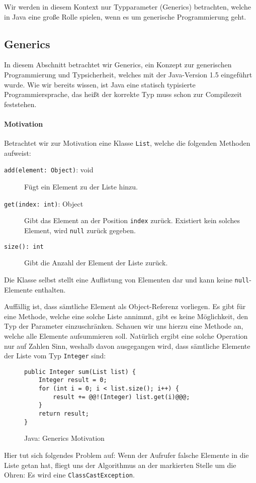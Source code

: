 
Wir werden in diesem Kontext nur Typparameter (Generics) betrachten, welche in Java eine große Rolle spielen, wenn es um generische Programmierung geht.

\subsection{Generics}
	\label{sec:generics}

	In diesem Abschnitt betrachtet wir Generics, ein Konzept zur generischen Programmierung und Typsicherheit, welches mit der Java-Version 1.5 eingeführt wurde. Wie wir bereits wissen, ist Java eine statisch typisierte Programmiersprache, das heißt der korrekte Typ muss schon zur Compilezeit feststehen.
	
	\paragraph{Motivation}
		Betrachtet wir zur Motivation eine Klasse \texttt{List}, welche die folgenden Methoden aufweist:
		\begin{description}
			\item[\texttt{add(element: Object)}: void] Fügt ein Element zu der Liste hinzu.
			\item[\texttt{get(index: int)}: Object] Gibt das Element an der Position \texttt{index} zurück. Existiert kein solches Element, wird \texttt{null} zurück gegeben.
			\item[\texttt{size(): int}] Gibt die Anzahl der Element der Liste zurück.
		\end{description}
		Die Klasse selbst stellt eine Auflistung von Elementen dar und kann keine \texttt{null}-Elemente enthalten.
		
		Auffällig ist, dass sämtliche Element als Object-Referenz vorliegen. Es gibt für eine Methode, welche eine solche Liste annimmt, gibt es keine Möglichkeit, den Typ der Parameter einzuschränken. Schauen wir uns hierzu eine Methode an, welche alle Elemente aufsummieren soll. Natürlich ergibt eine solche Operation nur auf Zahlen Sinn, weshalb davon ausgegangen wird, dass sämtliche Elemente der Liste vom Typ \texttt{Integer} sind:
		\begin{figure}[H]
			\centering
			\begin{lstlisting}[style = base]
public Integer sum(List list) {
	Integer result = 0;
	for (int i = 0; i < list.size(); i++) {
		result += @@!(Integer) list.get(i)@@@;
	}
	return result;
}
			\end{lstlisting}
			\caption{Java: Generics Motivation}
			\label{fig:generics_motivation}
		\end{figure}
		Hier tut sich folgendes Problem auf: Wenn der Aufrufer falsche Elemente in die Liste getan hat, fliegt uns der Algorithmus an der markierten Stelle um die Ohren: Es wird eine \texttt{ClassCastException}.
		
